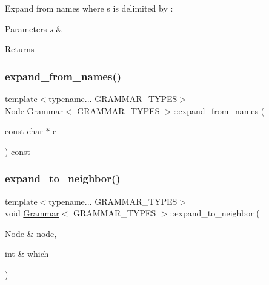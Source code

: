Expand from names where s is delimited by \textquotesingle{}\+:\textquotesingle{} 
\begin{DoxyParams}{Parameters}
{\em s} & \\
\hline
\end{DoxyParams}
\begin{DoxyReturn}{Returns}

\end{DoxyReturn}
\mbox{\label{class_grammar_af4f8e4c2b0ad93970e579ea56c2fde60}} 
\subsubsection{\texorpdfstring{expand\+\_\+from\+\_\+names()}{expand\_from\_names()}\hspace{0.1cm}{\footnotesize\ttfamily [3/3]}}
{\footnotesize\ttfamily template$<$typename... G\+R\+A\+M\+M\+A\+R\+\_\+\+T\+Y\+P\+ES$>$ \\
\hyperlink{class_node}{Node} \hyperlink{class_grammar}{Grammar}$<$ G\+R\+A\+M\+M\+A\+R\+\_\+\+T\+Y\+P\+ES $>$\+::expand\+\_\+from\+\_\+names (\begin{DoxyParamCaption}\item[{const char $\ast$}]{c }\end{DoxyParamCaption}) const\hspace{0.3cm}{\ttfamily [inline]}}

\mbox{\label{class_grammar_a0765273e6b0957410447ad5d74e424bf}} 
\subsubsection{\texorpdfstring{expand\+\_\+to\+\_\+neighbor()}{expand\_to\_neighbor()}}
{\footnotesize\ttfamily template$<$typename... G\+R\+A\+M\+M\+A\+R\+\_\+\+T\+Y\+P\+ES$>$ \\
void \hyperlink{class_grammar}{Grammar}$<$ G\+R\+A\+M\+M\+A\+R\+\_\+\+T\+Y\+P\+ES $>$\+::expand\+\_\+to\+\_\+neighbor (\begin{DoxyParamCaption}\item[{\hyperlink{class_node}{Node} \&}]{node,  }\item[{int \&}]{which }\end{DoxyParamCaption})\hspace{0.3cm}{\ttfamily [inline]}}


